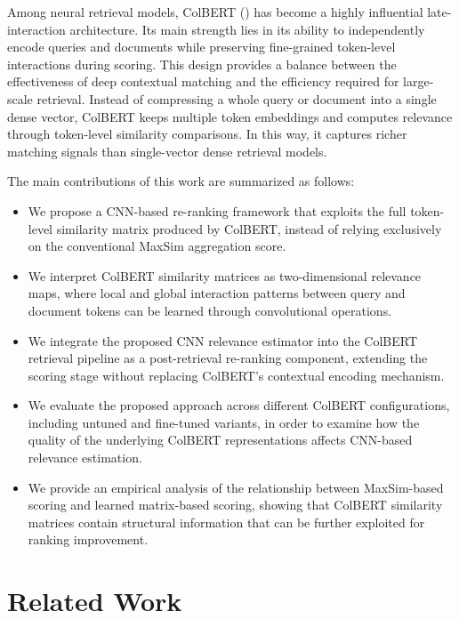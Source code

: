 \documentclass[preprint,5p,times,twocolumn,authoryear]{elsarticle}
\begin{document}
Among neural retrieval models, ColBERT (\cite{colbert,v2}) has become a highly influential late-interaction architecture. Its main strength lies in its ability to independently encode queries and documents while preserving fine-grained token-level interactions during scoring. This design provides a balance between the effectiveness of deep contextual matching and the efficiency required for large-scale retrieval. Instead of compressing a whole query or document into a single dense vector, ColBERT keeps multiple token embeddings and computes relevance through token-level similarity comparisons. In this way, it captures richer matching signals than single-vector dense retrieval models.

The main contributions of this work are summarized as follows:

\begin{itemize}
    \item We propose a CNN-based re-ranking framework that exploits the full token-level similarity matrix produced by ColBERT, instead of relying exclusively on the conventional MaxSim aggregation score.

    \item We interpret ColBERT similarity matrices as two-dimensional relevance maps, where local and global interaction patterns between query and document tokens can be learned through convolutional operations.

    \item We integrate the proposed CNN relevance estimator into the ColBERT retrieval pipeline as a post-retrieval re-ranking component, extending the scoring stage without replacing ColBERT's contextual encoding mechanism.

    \item We evaluate the proposed approach across different ColBERT configurations, including untuned and fine-tuned variants, in order to examine how the quality of the underlying ColBERT representations affects CNN-based relevance estimation.

    \item We provide an empirical analysis of the relationship between MaxSim-based scoring and learned matrix-based scoring, showing that ColBERT similarity matrices contain structural information that can be further exploited for ranking improvement.
\end{itemize}

\section{Related Work}
\label{sec:related}
\end{document}
